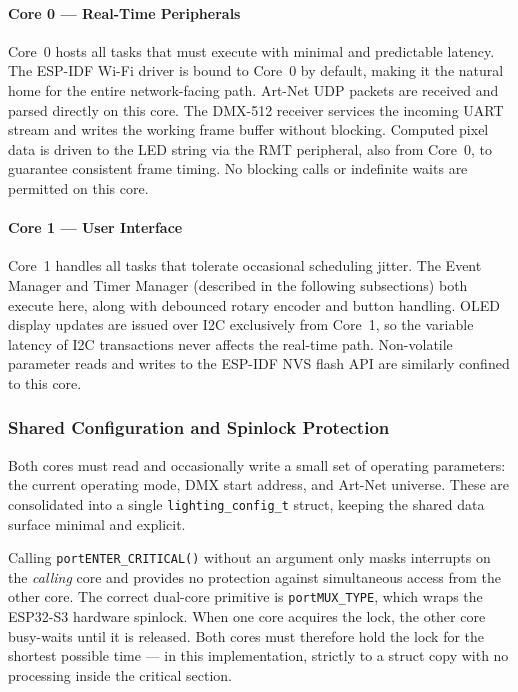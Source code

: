 \paragraph{Core 0 — Real-Time Peripherals}
Core~0 hosts all tasks that must execute with minimal and predictable latency.
The ESP-IDF Wi-Fi driver is bound to Core~0 by default, making it the natural home for the entire network-facing path.
Art-Net \ac{UDP} packets are received and parsed directly on this core.
The \ac{DMX}-512 receiver services the incoming \ac{UART} stream and writes the working frame buffer without blocking.
Computed pixel data is driven to the \ac{LED} string via the \ac{RMT} peripheral, also from Core~0, to guarantee consistent frame timing.
No blocking calls or indefinite waits are permitted on this core.

\paragraph{Core 1 — User Interface}
Core~1 handles all tasks that tolerate occasional scheduling jitter.
The Event Manager and Timer Manager (described in the following subsections) both execute here, along with debounced rotary encoder and button handling.
\ac{OLED} display updates are issued over \ac{I2C} exclusively from Core~1, so the variable latency of \ac{I2C} transactions never affects the real-time path.
Non-volatile parameter reads and writes to the ESP-IDF \ac{NVS} flash \ac{API} are similarly confined to this core.

\subsubsection{Shared Configuration and Spinlock Protection}
\label{sec:shared_config}

Both cores must read and occasionally write a small set of operating parameters: the current operating mode, \ac{DMX} start address, and Art-Net universe.
These are consolidated into a single \texttt{lighting\_config\_t} struct, keeping the shared data surface minimal and explicit.

Calling \texttt{portENTER\_CRITICAL()} without an argument only masks interrupts on the \emph{calling} core and provides no protection against simultaneous access from the other core.
The correct dual-core primitive is \texttt{portMUX\_TYPE}, which wraps the ESP32-S3 hardware spinlock.
When one core acquires the lock, the other core busy-waits until it is released.
Both cores must therefore hold the lock for the shortest possible time — in this implementation, strictly to a struct copy with no processing inside the critical section.

